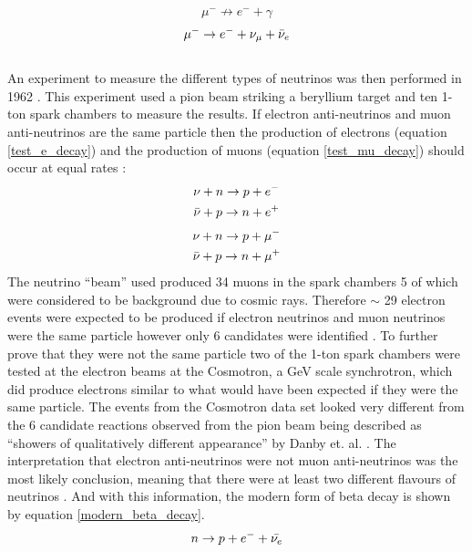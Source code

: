 \begin{equation}
    \mu^- \not\to e^- + \gamma
    \label{mu_forbiden_decay}
\end{equation}
\begin{equation}
    \mu^- \rightarrow e^- + \nu_\mu + \Bar{\nu}_e
    \label{proper_mu_decay}
\end{equation}
\\An experiment to measure the different types of neutrinos was then performed in 1962 \cite{DanbyG1962PhysRevLett.9.36}. This experiment used a pion beam striking a beryllium target and ten 1-ton spark chambers to measure the results. If electron anti-neutrinos and muon anti-neutrinos are the same particle then the production of electrons (equation \ref{test_e_decay}) and the production of muons (equation \ref{test_mu_decay}) should occur at equal rates \cite{DanbyG1962PhysRevLett.9.36}:
\begin{equation}
    \begin{split}
    \nu + n \rightarrow p + e^- \\
    \Bar{\nu} + p \rightarrow n + e^+
    \label{test_e_decay}
    \end{split}
\end{equation}
\begin{equation}
    \begin{split}
    \nu + n \rightarrow p + \mu^-  \\
    \Bar{\nu} + p \rightarrow n + \mu^+
    \label{test_mu_decay}
    \end{split}
\end{equation}
The neutrino ``beam'' used produced 34 muons in the spark chambers 5 of which were considered to be background due to cosmic rays. Therefore $\sim$ 29 electron events were expected to be produced if electron neutrinos and muon neutrinos were the same particle however only 6 candidates were identified \cite{DanbyG1962PhysRevLett.9.36}. To further prove that they were not the same particle two of the 1-ton spark chambers were tested at the electron beams at the Cosmotron, a GeV scale synchrotron, which did produce electrons similar to what would have been expected if they were the same particle. The events from the Cosmotron data set looked very different from the 6 candidate reactions observed from the pion beam being described as ``showers of qualitatively different appearance'' by Danby et. al. \cite{DanbyG1962PhysRevLett.9.36}. The interpretation that electron anti-neutrinos were not muon anti-neutrinos was the most likely conclusion, meaning that there were at least two different flavours of neutrinos \cite{DanbyG1962PhysRevLett.9.36}. And with this information, the modern form of beta decay is shown by equation \ref{modern_beta_decay}.
\begin{equation}
    n \rightarrow p + e^- + \Bar{\nu_e} 
    \label{modern_beta_decay}
\end{equation}

